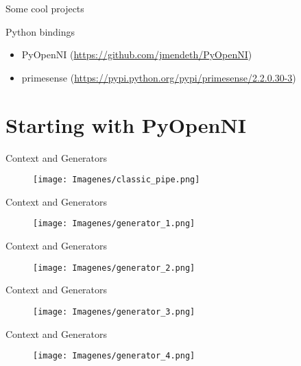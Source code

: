 \documentclass[bigger]{beamer}
\begin{document}
\begin{frame}{\ECFAugie Some cool projects}
\end{frame}

\begin{frame}[fragile]{\ECFAugie Python bindings}
\begin{itemize}
	\item PyOpenNI (\url{https://github.com/jmendeth/PyOpenNI})
	\item primesense (\url{https://pypi.python.org/pypi/primesense/2.2.0.30-3})
\end{itemize}

\end{frame}
\section{Starting with PyOpenNI}
\begin{frame}{\ECFAugie Context and Generators}
\begin{figure}[h]
		\texttt{[image: Imagenes/classic\_pipe.png]}
\end{figure}
\end{frame}

\begin{frame}{\ECFAugie Context and Generators}
\begin{figure}[h]
		\texttt{[image: Imagenes/generator\_1.png]}
\end{figure}
\end{frame}

\begin{frame}{\ECFAugie Context and Generators}
\begin{figure}[h]
		\texttt{[image: Imagenes/generator\_2.png]}
\end{figure}
\end{frame}

\begin{frame}{\ECFAugie Context and Generators}
\begin{figure}[h]
		\texttt{[image: Imagenes/generator\_3.png]}
\end{figure}
\end{frame}

\begin{frame}{\ECFAugie Context and Generators}
\begin{figure}[h]
		\texttt{[image: Imagenes/generator\_4.png]}
\end{figure}
\end{frame}
\end{document}
